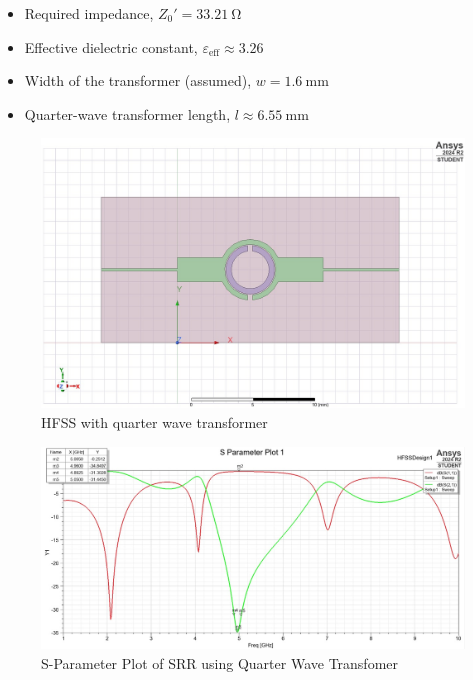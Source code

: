 \documentclass[conference]{IEEEtran}
\begin{document}
\begin{itemize}
    \item Required impedance, \( Z_0' = \SI{33.21}{\ohm} \)
    \item Effective dielectric constant, \( \varepsilon_{\text{eff}} \approx 3.26 \)
    \item Width of the transformer (assumed), \( w = \SI{1.6}{\milli\meter} \)
    \item Quarter-wave transformer length, \( l \approx \SI{6.55}{\milli\meter} \)
\end{itemize}
\begin{figure}[h]
    \centering
    \includegraphics[width=1\linewidth]{Images/WhatsApp Image 2025-05-06 at 06.33.22_90f1b653.jpg}
    \caption{HFSS with quarter wave transformer}
\end{figure}
\begin{figure}[h]
    \centering
    \includegraphics[width=1\linewidth]{Images/WhatsApp Image 2025-05-06 at 06.31.47_409a2904.jpg}
    \caption{S-Parameter Plot of SRR using Quarter Wave Transfomer}
\end{figure}
\end{document}
